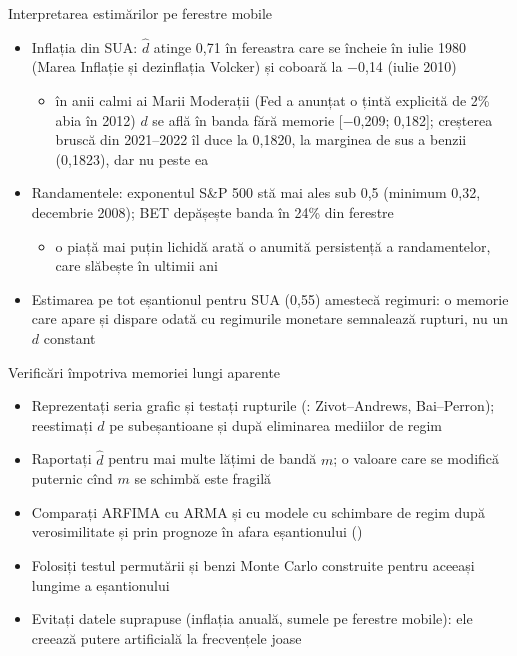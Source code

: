 \begin{frame}{Interpretarea estimărilor pe ferestre mobile}
\itemsize{\small}
\begin{itemize}
    \item Inflația din SUA: $\hat d$ atinge 0{,}71 în fereastra care se încheie în iulie 1980 (Marea Inflație și dezinflația Volcker) și coboară la $-$0{,}14 (iulie 2010)
    \begin{itemize}
        \item în anii calmi ai Marii Moderații (Fed a anunțat o țintă explicită de 2\% abia în 2012) $d$ se află în banda fără memorie [$-$0{,}209; 0{,}182]; creșterea bruscă din 2021--2022 îl duce la 0{,}1820, la marginea de sus a benzii (0{,}1823), dar nu peste ea
    \end{itemize}
    \item Randamentele: exponentul S\&P 500 stă mai ales sub 0,5 (minimum 0{,}32, decembrie 2008); BET depășește banda în 24\% din ferestre
    \begin{itemize}
        \item o piață mai puțin lichidă arată o anumită persistență a randamentelor, care slăbește în ultimii ani
    \end{itemize}
    \item Estimarea pe tot eșantionul pentru SUA (0,55) amestecă regimuri: o memorie care apare și dispare odată cu regimurile monetare semnalează rupturi, nu un $d$ constant
\end{itemize}
\end{frame}

\begin{frame}{Verificări împotriva memoriei lungi aparente}
\itemsize{\small}
\begin{itemize}
    \item Reprezentați seria grafic și testați rupturile (: Zivot--Andrews, Bai--Perron); reestimați $d$ pe subeșantioane și după eliminarea mediilor de regim
    \item Raportați $\hat d$ pentru mai multe lățimi de bandă $m$; o valoare care se modifică puternic cînd $m$ se schimbă este fragilă
    \item Comparați ARFIMA cu ARMA și cu modele cu schimbare de regim după verosimilitate și prin prognoze în afara eșantionului ()
    \item Folosiți testul permutării și benzi Monte Carlo construite pentru aceeași lungime a eșantionului
    \item Evitați datele suprapuse (inflația anuală, sumele pe ferestre mobile): ele creează putere artificială la frecvențele joase
\end{itemize}
\end{frame}

